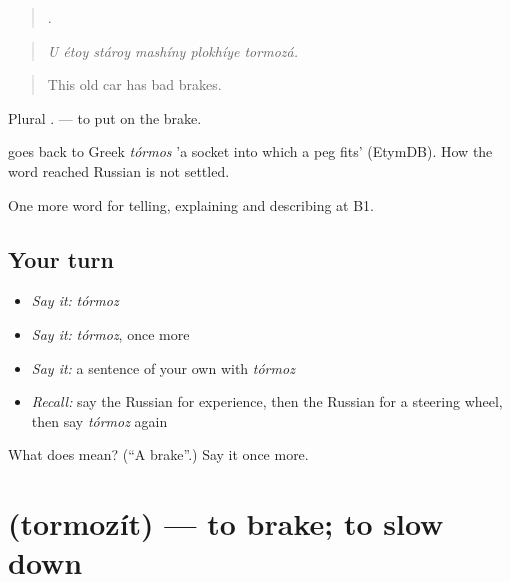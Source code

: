 \begin{quote}
     .
\end{quote}

\begin{quote}
\emph{U étoy stároy mashíny plokhíye tormozá.}
\end{quote}

\begin{quote}
This old car has bad brakes.
\end{quote}

Plural \emph{}. \emph{  } — to put on the brake.

\begin{cousinweb}
\emph{} goes back to Greek \emph{tórmos} 'a socket into which a peg fits' (EtymDB). How the word reached Russian is not settled.
\end{cousinweb}

\begin{grammarlens}[title={What you've built}]
One more word for telling, explaining and describing at B1.
\end{grammarlens}

\subsection*{Your turn}
\begin{itemize}
\raggedright
  \item \emph{Say it:} \emph{tórmoz}
  \item \emph{Say it:} \emph{tórmoz}, once more
  \item \emph{Say it:} a sentence of your own with \emph{tórmoz}
  \item \emph{Recall:} say the Russian for experience, then the Russian for a steering wheel, then say \emph{tórmoz} again
\end{itemize}

\begin{tcolorbox}[breakable,colback=teal!4,colframe=teal!35!black,title={Before you move on}]
What does  mean? (\textquotedblleft{}A brake\textquotedblright{}.) Say it once more.
\end{tcolorbox}
\section[\texorpdfstring{\ru{тормозить} (tormozít)}{тормозить (tormozít)}]{ (tormozít) — to brake; to slow down}

